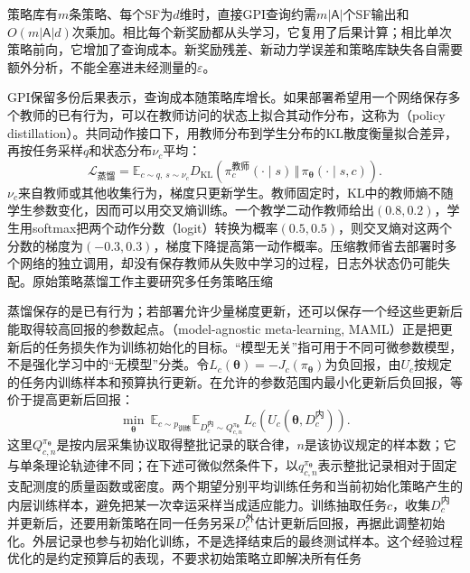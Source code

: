 策略库有$m$条策略、每个SF为$d$维时，直接GPI查询约需$m|\mathsf A|$个SF输出和$O(m|\mathsf A|d)$次乘加。相比每个新奖励都从头学习，它复用了后果计算；相比单次策略前向，它增加了查询成本。新奖励残差、新动力学误差和策略库缺失各自需要额外分析，不能全塞进未经测量的$\varepsilon$。

GPI保留多份后果表示，查询成本随策略库增长。如果部署希望用一个网络保存多个教师的已有行为，可以在教师访问的状态上拟合其动作分布，这称为（policy distillation）。共同动作接口下，用教师分布到学生分布的KL散度衡量拟合差异，再按任务采样$q$和状态分布$\nu_c$平均：
\[
 \mathcal L_{\text{蒸馏}}=
 \mathbb E_{c\sim q,\,s\sim\nu_c}
 D_{\mathrm{KL}}\!\left(\pi_c^{\text{教师}}(\cdot\mid s)
       \,\Vert\,\pi_{\bm\theta}(\cdot\mid s,c)\right).
\]
$\nu_c$来自教师或其他收集行为，梯度只更新学生。教师固定时，KL中的教师熵不随学生参数变化，因而可以用交叉熵训练。一个教学二动作教师给出$(0.8,0.2)$，学生用softmax把两个动作分数（logit）转换为概率$(0.5,0.5)$，则交叉熵对这两个分数的梯度为$(-0.3,0.3)$，梯度下降提高第一动作概率。压缩教师省去部署时多个网络的独立调用，却没有保存教师从失败中学习的过程，日志外状态仍可能失配。原始策略蒸馏工作主要研究多任务策略压缩

蒸馏保存的是已有行为；若部署允许少量梯度更新，还可以保存一个经这些更新后能取得较高回报的参数起点。（model-agnostic meta-learning, MAML）正是把更新后的任务损失作为训练初始化的目标。“模型无关”指可用于不同可微参数模型，不是强化学习中的“无模型”分类。令$L_c(\bm\theta)=-J_c(\pi_{\bm\theta})$为负回报，由$U_c$按规定的任务内训练样本和预算执行更新。在允许的参数范围内最小化更新后负回报，等价于提高更新后回报：
\begin{equation}
 \min_{\bm\theta}\ %
 \mathbb E_{c\sim p_{\text{训练}}}
 \mathbb E_{D_c^{\text{内}}\sim Q_{c,n}^{\pi_{\bm\theta}}}
 L_c\!\left(U_c(\bm\theta,D_c^{\text{内}})\right).
 \label{eq:rl-transfer-meta-objective}
\end{equation}
这里$Q_{c,n}^{\pi_{\bm\theta}}$是按内层采集协议取得整批记录的联合律，$n$是该协议规定的样本数；它与单条理论轨迹律不同；在下述可微似然条件下，以$q_{c,n}^{\pi_{\bm\theta}}$表示整批记录相对于固定支配测度的质量函数或密度。两个期望分别平均训练任务和当前初始化策略产生的内层训练样本，避免把某一次幸运采样当成适应能力。训练抽取任务$c$，收集$D_c^{\text{内}}$并更新后，还要用新策略在同一任务另采$D_c^{\text{外}}$估计更新后回报，再据此调整初始化。外层记录也参与初始化训练，不是选择结束后的最终测试样本。这个经验过程优化的是约定预算后的表现，不要求初始策略立即解决所有任务

